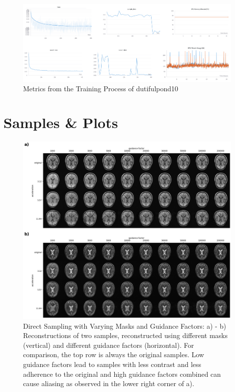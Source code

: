 \begin{figure}
    \centering
    \includegraphics[width=\textwidth]{images/dutifulpondmetrics.png}
    \caption[Metrics from the Training Process of dutifulpond10]{Metrics from the Training Process of dutifulpond10}
\end{figure}

\chapter{Samples \& Plots}
\begin{figure}[h]
    \centering
    \includegraphics[width=\textwidth]{images/directsampling_comparison.png}
    \caption[Direct Sampling with Varying Masks and Guidance Factors]{Direct Sampling with Varying Masks and Guidance Factors: a) - b) Reconstructions of two samples, reconstructed using different masks (vertical) and different guidance factors (horizontal). For comparison, the top row is always the original samples. Low guidance factors lead to samples with less contrast and less adherence to the original and high guidance factors combined can cause aliasing as observed in the lower right corner of a).}
\end{figure}

